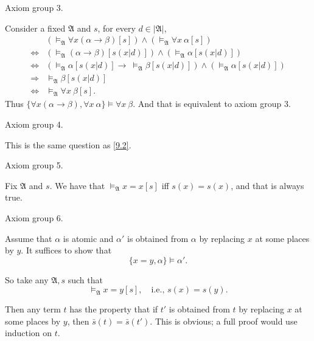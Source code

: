 
\begin{exercise}{10.1}
  Axiom group 3.
\end{exercise}

Consider a fixed $\mathfrak{A}$ and $s$, for every $d\in|\mathfrak{A}|$,
\begin{align*}
                  & (\vDash_{\mathfrak{A}}\forall x(\alpha\rightarrow \beta)[s])\wedge(\vDash_{\mathfrak{A}}\forall x\ \alpha[s])                    \\
  \Leftrightarrow & (\vDash_{\mathfrak{A}}(\alpha\rightarrow \beta)[s(x|d)])\wedge(\vDash_{\mathfrak{A}} \alpha[s(x|d)])                             \\
  \Leftrightarrow & (\vDash_{\mathfrak{A}}\alpha[s(x|d)]\rightarrow\ \vDash_{\mathfrak{A}}\beta[s(x|d)])\wedge(\vDash_{\mathfrak{A}} \alpha[s(x|d)]) \\
  \Rightarrow     & \vDash_{\mathfrak{A}}\beta[s(x|d)]                                                                                               \\
  \Leftrightarrow & \vDash_{\mathfrak{A}}\forall x\ \beta[s].
\end{align*}
Thus $\{\forall x(\alpha\rightarrow \beta),\forall x\ \alpha\}\vDash\forall x\ \beta$. And that is equivalent to axiom group 3.

\begin{exercise}{10.2}
  Axiom group 4.
\end{exercise}

This is the same question as \ref{9.2}.

\begin{exercise}{10.3}
  Axiom group 5.
\end{exercise}

Fix $\mathfrak A$ and $s$. We have that $\vDash_{\mathfrak A}x=x[s]$ iff $s(x)=s(x)$, and that is always true.

\begin{exercise}{10.4}
  Axiom group 6.
\end{exercise}

Assume that $\alpha$ is atomic and $\alpha'$ is obtained from $\alpha$ by replacing $x$ at some places by $y$. It suffices to show that
\[
  \{x = y, \alpha\} \vDash \alpha'.
\]

So take any $\mathfrak{A}, s$ such that
\[
  \vDash_{\mathfrak{A}} x = y[s], \quad \text{i.e., } s(x) = s(y).
\]

Then any term $t$ has the property that if $t'$ is obtained from $t$ by replacing $x$ at some places by $y$, then $\bar{s}(t) = \bar{s}(t')$. This is obvious; a full proof would use induction on $t$.

